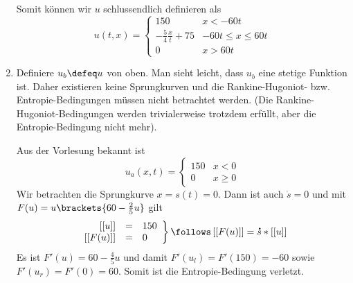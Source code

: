 \begin{exercisePage}
\begin{enumerate}[label=(zu \alph*)]
\begin{equation*}
\begin{aligned}
		\end{aligned}
	\end{equation*} 
	Somit können wir $u$ schlussendlich definieren als
	\begin{equation*}
		u(t,x) = 
		\begin{cases}
			150 & x < -60t \\
			-\frac{5}{4} \frac{x}{t} + 75 & -60t \le x \le 60t \\
			0 & x > 60t
		\end{cases}
	\end{equation*}
	\item Definiere $u_b \defeq u$ von oben. Man sieht leicht, dass $u_b$ eine stetige Funktion ist. Daher existieren keine Sprungkurven und die Rankine-Hugoniot- bzw. Entropie-Bedingungen müssen nicht betrachtet werden. (Die Rankine-Hugoniot-Bedingungen werden trivialerweise trotzdem erfüllt, aber die Entropie-Bedingung nicht mehr).
	
	Aus der Vorlesung bekannt ist 
	\begin{equation*}
		u_a(x,t) = 
		\begin{cases}
			150 & x < 0 \\
			0   & x \ge 0
		\end{cases}
	\end{equation*}
	Wir betrachten die Sprungkurve $x=s(t)=0$. Dann ist auch $\dot{s} = 0$ und mit $F(u) = u \brackets{60 - \frac{2}{5} u}$ gilt
	\begin{equation*}
		\left.\begin{array}{rcl}
			\dsq{u} &=& 150 \\
			\dsq{F(u)} &=& 0
		\end{array}
		\right\} \follows \dsq{F(u)} = \dot{s} * \dsq{u}
	\end{equation*}
	Es ist $F'(u) = 60 - \frac{4}{5} u$ und damit $F'(u_l) = F'(150) = -60$ sowie $F'(u_r) = F'(0) = 60$. Somit ist die Entropie-Bedingung verletzt.
\end{enumerate}

\end{exercisePage}
